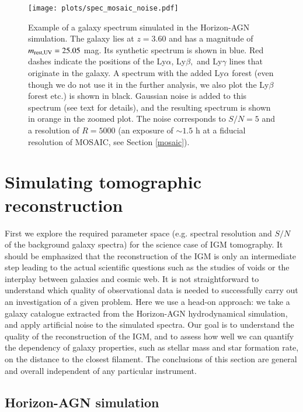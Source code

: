 \documentclass{aa}
\begin{document}
\begin{figure*}
\begin{center}
\texttt{[image: plots/spec\_mosaic\_noise.pdf]}
\caption{Example of a galaxy spectrum simulated in the {\sc Horizon-AGN} simulation. The galaxy lies at $z = 3.60$ and has a magnitude of $m_{\rm rest,UV} = 25.05$ mag. Its synthetic spectrum is shown in blue. Red dashes indicate the positions of the Ly$\alpha$, Ly$\beta,$ and Ly$\gamma$ lines that originate in the galaxy. A spectrum with the added Ly$\alpha$ forest (even though we do not use it in the further analysis, we also plot the Ly$\beta$ forest etc.) is shown in black. Gaussian noise is added to this spectrum (see text for details), and the resulting spectrum is shown in orange in the zoomed plot. The noise corresponds to $S/N = 5$ and a resolution of $R=5000$ (an exposure of $\sim 1.5$ h at a fiducial resolution of MOSAIC, see Section \ref{mosaic}).}
\label{fig4}
\end{center}
\end{figure*}

\section{Simulating tomographic reconstruction}
\label{horizon}

First we explore the required parameter space (e.g. spectral resolution and $S/N$ of the background galaxy spectra) for the science case of IGM tomography. It should be emphasized that the reconstruction of the IGM is only an intermediate step leading to the actual scientific questions such as the studies of voids or the interplay between galaxies and cosmic web. It is not straightforward to understand which quality of observational data is needed to successfully carry out an investigation of a given problem. Here we use a head-on approach: we take a galaxy catalogue extracted from the {\sc Horizon-AGN} hydrodynamical simulation, and apply artificial noise to the simulated spectra. Our goal is to understand the quality of the reconstruction of the IGM, and to assess how well we can quantify the dependency of galaxy properties, such as stellar mass and star formation rate, on the distance to the closest filament. The conclusions of this section are general and overall independent of any particular instrument.

\subsection{Horizon-AGN simulation}
\end{document}
